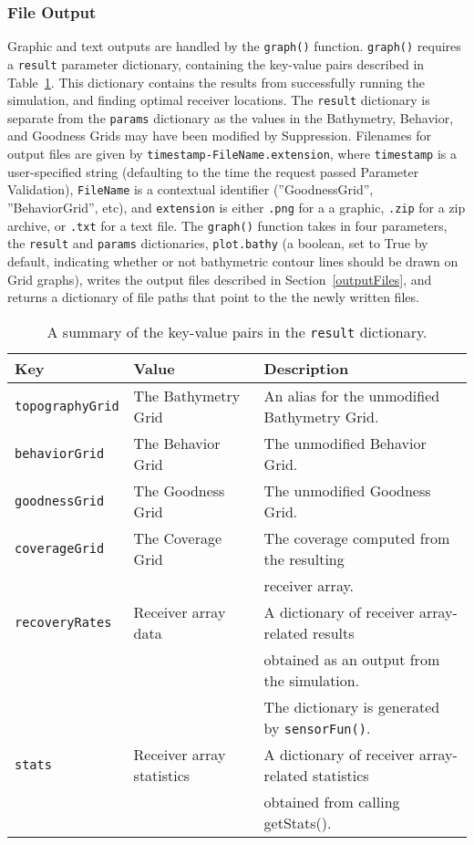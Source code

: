 \subsubsection{File Output}
Graphic and text outputs are handled by the \texttt{graph()} function. \texttt{graph()} requires a \texttt{result} parameter dictionary, containing the key-value pairs described in Table~\ref{resultDict}.  This dictionary contains the results from successfully running the simulation, and finding optimal receiver locations.  The \texttt{result} dictionary is separate from the \texttt{params} dictionary as the values in the Bathymetry, Behavior, and Goodness Grids may have been modified by Suppression.  Filenames for output files are given by \texttt{timestamp-FileName.extension}, where \texttt{timestamp} is a user-specified string (defaulting to the time the request passed Parameter Validation), \texttt{FileName} is a contextual identifier (''GoodnessGrid'', ''BehaviorGrid'', etc), and \texttt{extension} is either \texttt{.png} for a a graphic, \texttt{.zip} for a zip archive, or \texttt{.txt} for a text file.  The \texttt{graph()} function takes in four parameters, the \texttt{result} and \texttt{params} dictionaries, \texttt{plot.bathy} (a boolean, set to True by default, indicating whether or not bathymetric contour lines should be drawn on Grid graphs), writes the output files described in Section~\ref{outputFiles}, and returns a dictionary of file paths that point to the the newly written files.

\begin{table}[ht]
	\begin{tabular}{l l l}
		Key	&	Value &	Description\\
		\hline
		\texttt{topographyGrid}	&	The Bathymetry Grid			&	An alias for the unmodified Bathymetry Grid.\\
		\texttt{behaviorGrid}	&	The Behavior Grid			&	The unmodified Behavior Grid.\\
		\texttt{goodnessGrid}	&	The Goodness Grid			&	The unmodified Goodness Grid.\\
		\texttt{coverageGrid}	& 	The Coverage Grid			&	The coverage computed from the resulting\\
								&								&	receiver array.\\
		\texttt{recoveryRates}	& 	Receiver array data			&	A dictionary of receiver array-related results\\
								&								&  obtained as an output from the simulation. \\
								&								&  The dictionary is generated by \texttt{sensorFun()}.\\
		\texttt{stats}			& 	Receiver array statistics	&	A dictionary of receiver array-related statistics\\
								&								&  obtained from calling getStats().\\
	\end{tabular}
	\caption{A summary of the key-value pairs in the \texttt{result} dictionary.
		\label{resultDict}}
\end{table}


